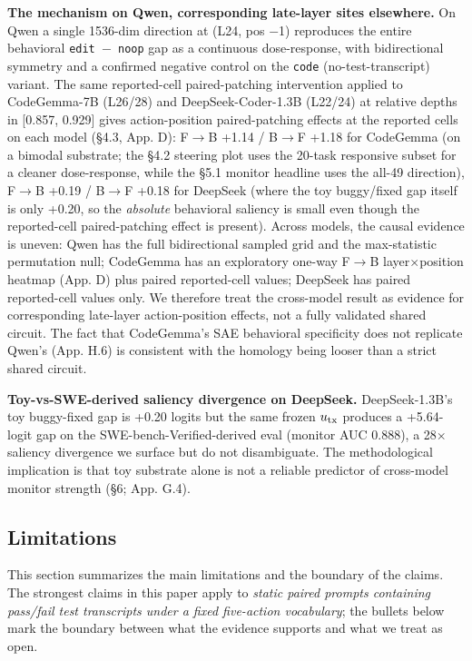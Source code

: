 \documentclass[
  11pt,
  a4paper]{article}
\begin{document}
\textbf{The mechanism on Qwen, corresponding late-layer sites
elsewhere.} On Qwen a single 1536-dim direction at (L24, pos \ensuremath{-}1)
reproduces the entire behavioral \texttt{edit\ \ensuremath{-}\ noop} gap as a
continuous dose-response, with bidirectional symmetry and a confirmed
negative control on the \texttt{code} (no-test-transcript) variant. The
same reported-cell paired-patching intervention applied to CodeGemma-7B
(L26/28) and DeepSeek-Coder-1.3B (L22/24) at relative depths in
{[}0.857, 0.929{]} gives action-position paired-patching effects at the
reported cells on each model (\S{}4.3, App. D): F\ensuremath{\rightarrow}B +1.14 / B\ensuremath{\rightarrow}F +1.18 for
CodeGemma (on a bimodal substrate; the \S{}4.2 steering plot uses the
20-task responsive subset for a cleaner dose-response, while the \S{}5.1
monitor headline uses the all-49 direction), F\ensuremath{\rightarrow}B +0.19 / B\ensuremath{\rightarrow}F +0.18 for
DeepSeek (where the toy buggy/fixed gap itself is only +0.20, so the
\emph{absolute} behavioral saliency is small even though the
reported-cell paired-patching effect is present). Across models, the
causal evidence is uneven: Qwen has the full bidirectional sampled grid
and the max-statistic permutation null; CodeGemma has an exploratory
one-way F\ensuremath{\rightarrow}B layer\ensuremath{\times}position heatmap (App. D) plus paired reported-cell
values; DeepSeek has paired reported-cell values only. We therefore
treat the cross-model result as evidence for corresponding late-layer
action-position effects, not a fully validated shared circuit. The fact
that CodeGemma's SAE behavioral specificity does not replicate Qwen's
(App. H.6) is consistent with the homology being looser than a strict
shared circuit.

\textbf{Toy-vs-SWE-derived saliency divergence on DeepSeek.}
DeepSeek-1.3B's toy buggy-fixed gap is +0.20 logits but the same frozen
\(u_{\rm tx}\) produces a +5.64-logit gap on the
SWE-bench-Verified-derived eval (monitor AUC 0.888), a 28\ensuremath{\times} saliency
divergence we surface but do not disambiguate. The methodological
implication is that toy substrate alone is not a reliable predictor of
cross-model monitor strength (\S{}6; App. G.4).

\subsection{Limitations}\label{limitations}

This section summarizes the main limitations and the boundary of the
claims. The strongest claims in this paper apply to \emph{static paired
prompts containing pass/fail test transcripts under a fixed five-action
vocabulary}; the bullets below mark the boundary between what the
evidence supports and what we treat as open.
\end{document}
